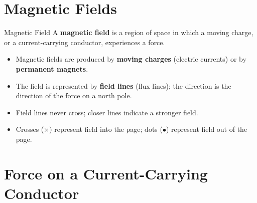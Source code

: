 

\section{Magnetic Fields}

\begin{definitionbox}{Magnetic Field}
A \textbf{magnetic field} is a region of space in which a moving charge, or a current-carrying conductor, experiences a force.
\begin{itemize}[itemsep=2pt]
  \item Magnetic fields are produced by \textbf{moving charges} (electric currents) or by \textbf{permanent magnets}.
  \item The field is represented by \textbf{field lines} (flux lines); the direction is the direction of the force on a north pole.
  \item Field lines never cross; closer lines indicate a stronger field.
  \item Crosses ($\times$) represent field into the page; dots ($\bullet$) represent field out of the page.
\end{itemize}
\end{definitionbox}

\section{Force on a Current-Carrying Conductor}

